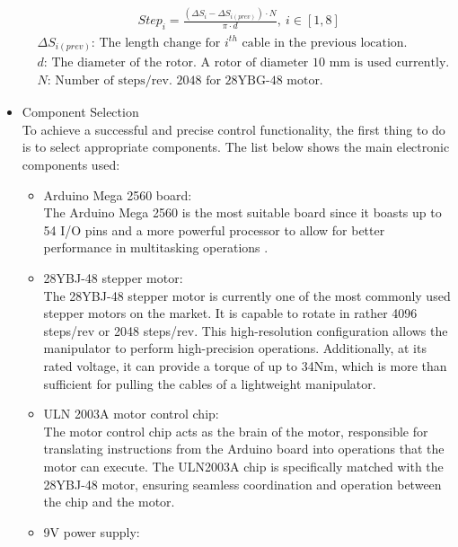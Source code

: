 \begin{itemize}
    \vspace{-5mm}
    \begin{align}
        & \qquad\qquad\qquad\qquad Step_i=\frac{(\Delta S_i-\Delta S_{i(prev)})\cdot N}{\pi\cdot d}, \ i\in[1,8] 
        \label{eq:step_motor_arduino} \\
        &\Delta S_{i(prev)} \text{: The length change for $i^{th}$ cable in the previous location.} \nonumber \\
        &d\text{: The diameter of the rotor. A rotor of diameter 10 mm is used currently.} \nonumber \\
        &N\text{: Number of steps/rev. 2048 for 28YBG-48 motor.}\nonumber 
    \end{align}
    \vspace{-15mm}
    \item Component Selection \\
    To achieve a successful and precise control functionality, the first thing to do is to select appropriate 
    components. The list below shows the main electronic components used:
    \begin{itemize}
        \item Arduino Mega 2560 board: \\
        The Arduino Mega 2560 is the most suitable board since it boasts up to 54 I/O pins and a more powerful 
        processor to allow for better performance in multitasking operations \cite{arduino_guide}.
        \item 28YBJ-48 stepper motor: \\
        The 28YBJ-48 stepper motor is currently one of the most commonly used stepper motors on the market. It is capable to rotate
         in rather 4096 steps/rev or 2048 steps/rev. This high-resolution configuration allows the 
        manipulator to perform high-precision operations. Additionally, at its rated voltage, it can provide 
        a torque of up to 34Nm, which is more than sufficient for pulling the cables of a lightweight manipulator.
        \item ULN 2003A motor control chip: \\
        The motor control chip acts as the brain of the motor, responsible for translating instructions from the 
        Arduino board into operations that the motor can execute. The ULN2003A chip is specifically matched with 
        the 28YBJ-48 motor, ensuring seamless coordination and operation between the chip and the motor. 
        \item 9V power supply: \\

\end{itemize}
\end{itemize}

